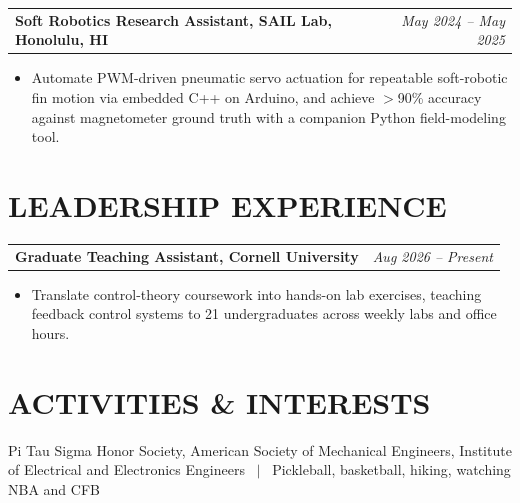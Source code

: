 \documentclass[10.5pt]{article}
\makeatletter
\newcommand{\entryline}[2]{%
  \noindent
  \begin{tabularx}{\linewidth}{@{}X r@{}}
    \textbf{#1} & \textit{#2}
  \end{tabularx}%
  \par
}
\newcommand{\subgap}{\vspace{3pt}}   %
\makeatother
\begin{document}
\entryline{Soft Robotics Research Assistant, SAIL Lab, Honolulu, HI}{May 2024 -- May 2025}
\subgap
\begin{itemize}
  \item Automate PWM-driven pneumatic servo actuation for repeatable soft-robotic fin motion via embedded C++ on Arduino, and achieve $>$90\% accuracy against magnetometer ground truth with a companion Python field-modeling tool.
\end{itemize}

\section{LEADERSHIP EXPERIENCE}

\entryline{Graduate Teaching Assistant, Cornell University}{Aug 2026 -- Present}
\subgap
\begin{itemize}
  \item Translate control-theory coursework into hands-on lab exercises, teaching feedback control systems to 21 undergraduates across weekly labs and office hours.
\end{itemize}

\section{ACTIVITIES \& INTERESTS}
\noindent Pi Tau Sigma Honor Society, American Society of Mechanical Engineers, Institute of Electrical and Electronics Engineers \ $\vert$ \ Pickleball, basketball, hiking, watching NBA and CFB
\par
\end{document}

